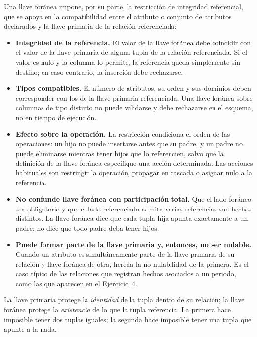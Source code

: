 Una llave foránea impone, por su parte, la restricción de integridad
referencial, que se apoya en la compatibilidad entre el atributo o conjunto de
atributos declarados y la llave primaria de la relación referenciada:

\begin{itemize}
  \item \textbf{Integridad de la referencia.} El valor de la llave foránea
    debe coincidir con el valor de la llave primaria de alguna tupla de la
    relación referenciada. Si el valor es nulo y la columna lo permite, la
    referencia queda simplemente sin destino; en caso contrario, la inserción
    debe rechazarse.
  \item \textbf{Tipos compatibles.} El número de atributos, su orden y sus
    dominios deben corresponder con los de la llave primaria referenciada. Una
    llave foránea sobre columnas de tipo distinto no puede validarse y debe
    rechazarse en el esquema, no en tiempo de ejecución.
  \item \textbf{Efecto sobre la operación.} La restricción condiciona el orden
    de las operaciones: un hijo no puede insertarse antes que su padre, y un
    padre no puede eliminarse mientras tener hijos que lo referencien, salvo
    que la definición de la llave foránea especifique una acción determinada.
    Las acciones habituales son restringir la operación, propagar en cascada o
    asignar nulo a la referencia.
  \item \textbf{No confunde llave foránea con participación total.} Que el
    lado foráneo sea obligatorio y que el lado referenciado admita varias
    referencias son hechos distintos. La llave foránea dice que cada tupla
    hija apunta exactamente a un padre; no dice que todo padre deba tener
    hijos.
  \item \textbf{Puede formar parte de la llave primaria y, entonces, no ser
    nulable.} Cuando un atributo es simultáneamente parte de la llave primaria
    de su relación y llave foránea de otra, hereda la no nulabilidad de la
    primera. Es el caso típico de las relaciones que registran hechos
    asociados a un periodo, como las que aparecen en el Ejercicio~4.
\end{itemize}

\begin{conceptobox}
La llave primaria protege la \emph{identidad} de la tupla dentro de su
  relación; la llave foránea protege la \emph{existencia} de lo que la tupla
  referencia. La primera hace imposible tener dos tuplas iguales; la segunda
  hace imposible tener una tupla que apunte a la nada.
\end{conceptobox}

